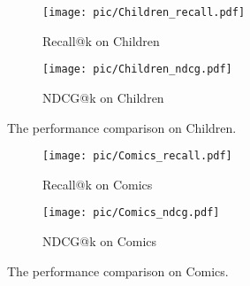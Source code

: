 \documentclass[sigconf]{acmart}
\begin{document}
\begin{figure}[t!]
    \centering
    \begin{subfigure}[t]{0.25\textwidth}
        \centering
        \texttt{[image: pic/Children\_recall.pdf]}
        \caption{\label{fig:Children_recall} Recall@k on Children}
    \end{subfigure}\begin{subfigure}[t]{0.25\textwidth}
        \centering
        \texttt{[image: pic/Children\_ndcg.pdf]}
        \caption{\label{fig:Children_ndcg} NDCG@k on Children}
    \end{subfigure}
    \caption{\label{fig:children}The performance comparison on Children.}
\vspace{-0.3cm}
\end{figure}

\begin{figure}[t!]
    \centering
    \begin{subfigure}[t]{0.25\textwidth}
        \centering
        \texttt{[image: pic/Comics\_recall.pdf]}
        \caption{\label{fig:Comics_recall} Recall@k on Comics}
    \end{subfigure}\begin{subfigure}[t]{0.25\textwidth}
        \centering
        \texttt{[image: pic/Comics\_ndcg.pdf]}
        \caption{\label{fig:Comics_ndcg} NDCG@k on Comics}
    \end{subfigure}
    \caption{\label{fig:comics}The performance comparison on Comics.}
\vspace{-0.3cm}
\end{figure}
\end{document}
